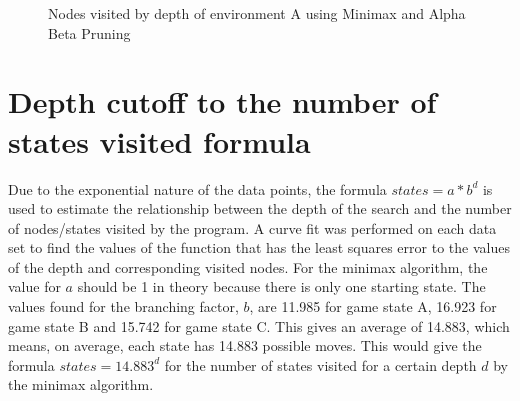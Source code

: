 \documentclass[11pt]{article}
\begin{document}
\begin{figure}[ht]
\centering
{}	
\caption{Nodes visited by depth of environment A using Minimax and Alpha Beta Pruning}
\end{figure}


\section{Depth cutoff to the number of states visited formula}

Due to the exponential nature of the data points, the formula $ states = a*b^d $ is used to estimate the relationship between the depth of the search and the number of nodes/states visited by the program. A curve fit was performed on each data set to find the values of the function that has the least squares error to the  values of the depth and corresponding visited nodes. For the minimax algorithm, the value for $a$ should be 1 in theory because there is only one starting state. The values found for the branching factor, $b$, are 11.985 for game state A, 16.923 for game state B and 15.742 for game state C. This gives an average of 14.883, which means, on average, each state has 14.883 possible moves. This would give the formula $ states = 14.883^d $ for the number of states visited for a certain depth $d$ by the minimax algorithm.
\end{document}
